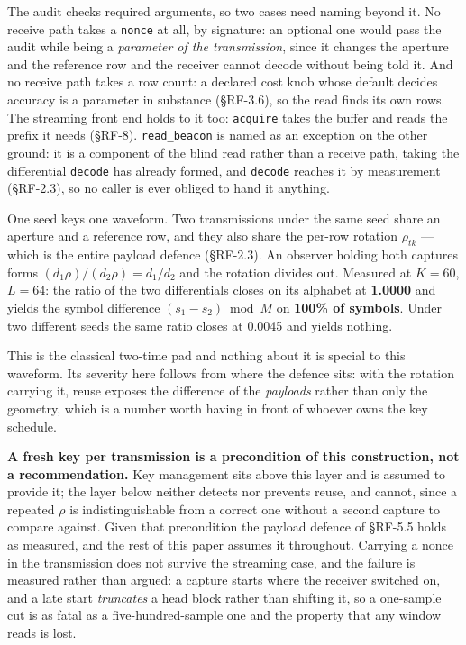 \documentclass[10pt,letterpaper,twocolumn]{article}
\begin{document}
The audit checks required arguments, so two cases need naming beyond it. No receive path takes a \texttt{nonce} at all, by signature: an optional one would pass the audit while being a \emph{parameter of the transmission}, since it changes the aperture and the reference row and the receiver cannot decode without being told it. And no receive path takes a row count: a declared cost knob whose default decides accuracy is a parameter in substance (§RF-3.6), so the read finds its own rows. The streaming front end holds to it too: \texttt{acquire} takes the buffer and reads the prefix it needs (§RF-8). \texttt{read\_\allowbreak{}beacon} is named as an exception on the other ground: it is a component of the blind read rather than a receive path, taking the differential \texttt{decode} has already formed, and \texttt{decode} reaches it by measurement (§RF-2.3), so no caller is ever obliged to hand it anything.

One seed keys one waveform. Two transmissions under the same seed share an aperture and a reference row, and they also share the per-row rotation \(\rho_{tk}\) --- which is the entire payload defence (§RF-2.3). An observer holding both captures forms \((d_1\rho)/(d_2\rho) = d_1/d_2\) and the rotation divides out. Measured at \(K=60\), \(L=64\): the ratio of the two differentials closes on its alphabet at \textbf{1.0000} and yields the symbol difference \((s_1 - s_2) \bmod M\) on \textbf{100\% of symbols}. Under two different seeds the same ratio closes at 0.0045 and yields nothing.

This is the classical two-time pad and nothing about it is special to this waveform. Its severity here follows from where the defence sits: with the rotation carrying it, reuse exposes the difference of the \emph{payloads} rather than only the geometry, which is a number worth having in front of whoever owns the key schedule.

\textbf{A fresh key per transmission is a precondition of this construction, not a recommendation.} Key management sits above this layer and is assumed to provide it; the layer below neither detects nor prevents reuse, and cannot, since a repeated \(\rho\) is indistinguishable from a correct one without a second capture to compare against. Given that precondition the payload defence of §RF-5.5 holds as measured, and the rest of this paper assumes it throughout. Carrying a nonce in the transmission does not survive the streaming case, and the failure is measured rather than argued: a capture starts where the receiver switched on, and a late start \emph{truncates} a head block rather than shifting it, so a one-sample cut is as fatal as a five-hundred-sample one and the property that any window reads is lost.
\end{document}
